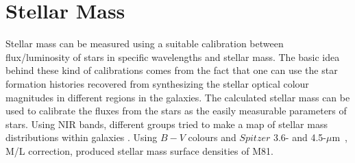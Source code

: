 \documentclass[useAMS,usenatbib]{mn2e}
\newcommand \kpc        {\,{\rm kpc}}
\newcommand \um    {$\mu$m\ }
\begin{document}


\section{Stellar Mass}
\label{starmass}
Stellar mass can be measured using a suitable calibration between flux/luminosity of stars in specific wavelengths and stellar mass. The basic idea behind these kind of calibrations comes from the fact that one can use the star formation histories recovered from synthesizing the stellar optical colour magnitudes in different regions in the galaxies. The calculated stellar mass can be used  to calibrate the fluxes from the stars as the easily measurable parameters of stars. Using NIR bands, different groups tried to make a map of stellar mass distributions within galaxies \citep[e.g.,][]{Elmgreen84}.  Using $B-V$ colours \citep{Bell01} and $Spitzer$ 3.6- and 4.5-\um, M/L correction, \cite{Kendall08} produced stellar mass surface densities of M81. %
\end{document}
